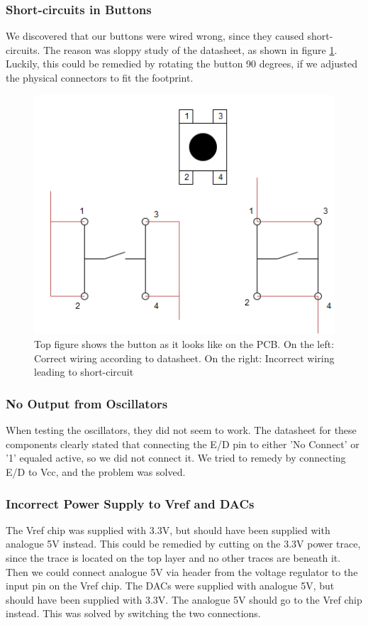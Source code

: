 \subsubsection{Short-circuits in Buttons}
We discovered that our buttons were wired wrong, since they caused short-circuits. The reason was sloppy study of the datasheet, as shown in figure \ref{fig:Button Issue}. Luckily, this could be remedied by rotating the button 90 degrees, if we adjusted the physical connectors to fit the footprint.

\begin{figure}[h!]
\centering
\includegraphics[scale=0.5]{images/Button_Issue.png}
\caption{Top figure shows the button as it looks like on the PCB. On the left: Correct wiring according to datasheet. On the right: Incorrect wiring leading to short-circuit}
\label{fig:Button Issue}
\end{figure}

\subsubsection{No Output from Oscillators}
When testing the oscillators, they did not seem to work. The datasheet for these components clearly stated that connecting the E/D pin to either 'No Connect' or '1' equaled active, so we did not connect it. We tried to remedy by connecting E/D to Vcc, and the problem was solved.

\subsubsection{Incorrect Power Supply to Vref and DACs}
The Vref chip was supplied with 3.3V, but should have been supplied with analogue 5V instead. This could be remedied by cutting on the 3.3V power trace, since the trace is located on the top layer and no other traces are beneath it. Then we could connect analogue 5V via header from the voltage regulator to the input pin on the Vref chip.
\newline
The DACs were supplied with analogue 5V, but should have been supplied with 3.3V. The analogue 5V should go to the Vref chip instead. This was solved by switching the two connections.

